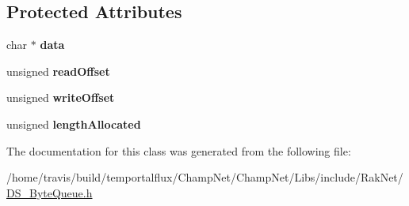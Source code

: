 \subsection*{Protected Attributes}
\begin{DoxyCompactItemize}
\item 
\hypertarget{class_data_structures_1_1_byte_queue_a28ba1ed7479ae358be3a59745919a75e}{char $\ast$ {\bfseries data}}\label{class_data_structures_1_1_byte_queue_a28ba1ed7479ae358be3a59745919a75e}

\item 
\hypertarget{class_data_structures_1_1_byte_queue_aca87a2d80232d16183e0f3df6ac05f45}{unsigned {\bfseries read\-Offset}}\label{class_data_structures_1_1_byte_queue_aca87a2d80232d16183e0f3df6ac05f45}

\item 
\hypertarget{class_data_structures_1_1_byte_queue_a85f8fee5b33abdd82ee1a6251adbaf58}{unsigned {\bfseries write\-Offset}}\label{class_data_structures_1_1_byte_queue_a85f8fee5b33abdd82ee1a6251adbaf58}

\item 
\hypertarget{class_data_structures_1_1_byte_queue_a58bf3cbb92ffd26a9466abb668e14f00}{unsigned {\bfseries length\-Allocated}}\label{class_data_structures_1_1_byte_queue_a58bf3cbb92ffd26a9466abb668e14f00}

\end{DoxyCompactItemize}


The documentation for this class was generated from the following file\-:\begin{DoxyCompactItemize}
\item 
/home/travis/build/temportalflux/\-Champ\-Net/\-Champ\-Net/\-Libs/include/\-Rak\-Net/\hyperlink{_d_s___byte_queue_8h}{D\-S\-\_\-\-Byte\-Queue.\-h}\end{DoxyCompactItemize}
